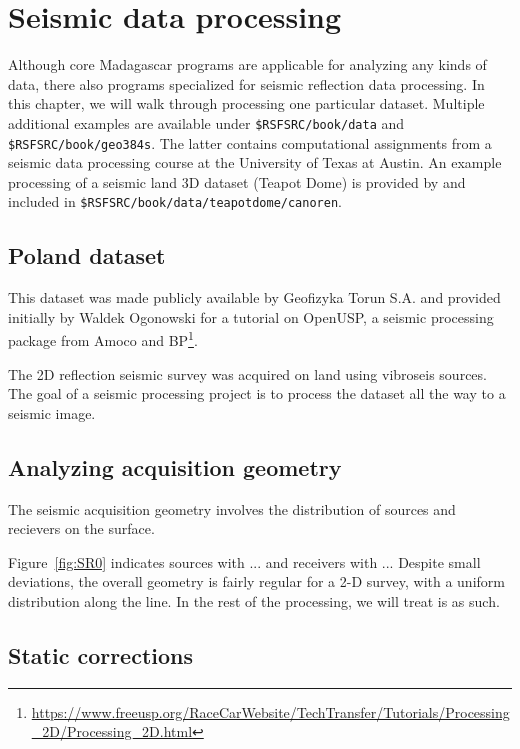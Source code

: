 \chapter{Seismic data processing}

Although core Madagascar programs are applicable for analyzing any
kinds of data, there also programs specialized for seismic reflection
data processing. In this chapter, we will walk through processing one
particular dataset. Multiple additional examples are available under
\texttt{\$RSFSRC/book/data} and \texttt{\$RSFSRC/book/geo384s}. The
latter contains computational assignments from a seismic data
processing course at the University of Texas at Austin. An example
processing of a seismic land 3D dataset (Teapot Dome) is provided by
\cite{oren2018overview} and included in
\texttt{\$RSFSRC/book/data/teapotdome/canoren}.

\section{Poland dataset}

This dataset was made publicly available by Geofizyka Torun S.A. and
provided initially by Waldek Ogonowski for a tutorial on OpenUSP, a
seismic processing package from Amoco and
BP\footnote{\url{https://www.freeusp.org/RaceCarWebsite/TechTransfer/Tutorials/Processing_2D/Processing_2D.html}}.

The 2D reflection seismic survey was acquired on land using vibroseis
sources. The goal of a seismic processing project is to process the
dataset all the way to a seismic image.

\section{Analyzing acquisition geometry}

The seismic acquisition geometry involves the distribution of sources
and recievers on the surface.


Figure~\ref{fig:SR0} indicates sources with ... and receivers with
... Despite small deviations, the overall geometry is fairly regular
for a 2-D survey, with a uniform distribution along the line. In the
rest of the processing, we will treat is as such.

\section{Static corrections}


